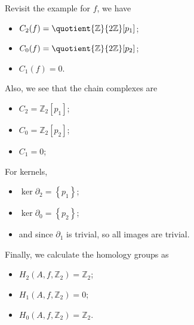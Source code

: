 \begin{eg}
	Revisit the example for \(f\), we have
	\begin{itemize}
		\item \(C_2(f) = \quotient{\mathbb{Z} }{2 \mathbb{Z} } [p_1]\);
		\item \(C_0(f) = \quotient{\mathbb{Z} }{2 \mathbb{Z} } [p_2]\);
		\item \(C_1(f) = 0\).
	\end{itemize}
	Also, we see that the chain complexes are
	\begin{itemize}
		\item \(C_2 = \mathbb{Z} _2[p_1]\);
		\item \(C_0 = \mathbb{Z} _2[p_2]\);
		\item \(C_1 = 0\);
	\end{itemize}
	For kernels,
	\begin{itemize}
		\item \(\ker \partial _2 = \left\{ p_1 \right\} \);
		\item \(\ker \partial _0 = \left\{ p_2 \right\} \);
		\item and since \(\partial _1\) is trivial, so all images are trivial.
	\end{itemize}
	Finally, we calculate the homology groups as
	\begin{itemize}
		\item \(H_2(A , f, \mathbb{Z} _2) = \mathbb{Z} _2\);
		\item \(H_1(A , f, \mathbb{Z} _2) = 0\);
		\item \(H_0(A , f, \mathbb{Z} _2) = \mathbb{Z} _2\).
	\end{itemize}
\end{eg}

